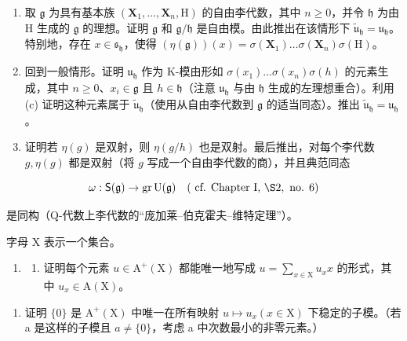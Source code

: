 \begin{enumerate}
\def\labelenumi{(\alph{enumi})}
\setcounter{enumi}{2}
\item
  取 \(\mathfrak{g}\) 为具有基本族 \((\mathbf{X}_1, \ldots, \mathbf{X}_n, \mathrm{H})\) 的自由李代数，其中 \(n \geqslant 0\)，并令 \(\mathfrak{h}\) 为由 H 生成的 \(\mathfrak{g}\) 的理想。证明 \(\mathfrak{g}\) 和 \(\mathfrak{g} / \mathfrak{h}\) 是自由模。由此推出在该情形下 \(\tilde{\mathfrak{u}}_{\mathfrak{h}} = \mathfrak{u}_{\mathfrak{h}}\)。特别地，存在 \(x \in \mathfrak{s}_{\mathfrak{h}}\)，使得 \((\eta(\mathfrak{g}))(x) = \sigma(\mathbf{X}_1) \ldots \sigma(\mathbf{X}_n) \sigma(\mathrm{H})\)。
\item
  回到一般情形。证明 \(\mathfrak{u}_{\mathfrak{h}}\) 作为 \(\mathrm{K}\)-模由形如 \(\sigma(x_1) \ldots \sigma(x_n)\sigma(h)\) 的元素生成，其中 \(n \geqslant 0\)、\(x_i \in \mathfrak{g}\) 且 \(h \in \mathfrak{h}\)（注意 \(\mathfrak{u}_{\mathfrak{h}}\) 与由 \(\mathfrak{h}\) 生成的左理想重合）。利用 (c) 证明这种元素属于 \(\tilde{\mathfrak{u}}_{\mathfrak{h}}\)（使用从自由李代数到 \(\mathfrak{g}\) 的适当同态）。推出 \(\tilde{\mathfrak{u}}_{\mathfrak{h}} = \mathfrak{u}_{\mathfrak{h}}\)。
\item
  证明若 \(\eta(g)\) 是双射，则 \(\eta(g/h)\) 也是双射。最后推出，对每个李代数 \(g, \eta(g)\) 都是双射（将 \(g\) 写成一个自由李代数的商），并且典范同态
\end{enumerate}

\[
\omega : \mathsf {S} (\mathfrak {g}) \to \operatorname{gr} \mathrm{U} (\mathfrak {g}) \quad (\text { cf.   Chapter   I,   } \S 2, \text {   no.   } 6)
\]

是同构（Q-代数上李代数的“庞加莱–伯克霍夫–维特定理”）。


字母 X 表示一个集合。

\begin{enumerate}
\def\labelenumi{\arabic{enumi}.}
\tightlist
\item
  \begin{enumerate}
  \def\labelenumii{(\alph{enumii})}
  \tightlist
  \item
    证明每个元素 \(u \in \mathrm{A}^{+}(\mathrm{X})\) 都能唯一地写成 \(u = \sum_{x \in \mathrm{X}} u_{x} x\) 的形式，其中 \(u_{x} \in \mathrm{A}(\mathrm{X})\)。
  \end{enumerate}
\end{enumerate}

\begin{enumerate}
\def\labelenumi{(\alph{enumi})}
\setcounter{enumi}{1}
\tightlist
\item
  证明 \(\{0\}\) 是 \(\mathrm{A}^{+}(\mathrm{X})\) 中唯一在所有映射 \(u \mapsto u_{x} (x \in \mathrm{X})\) 下稳定的子模。（若 a 是这样的子模且 \(a \neq \{0\}\)，考虑 a 中次数最小的非零元素。）
\end{enumerate}

